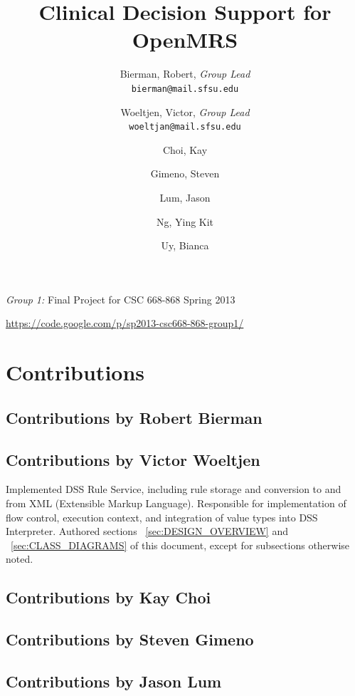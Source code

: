 \documentclass[12pt,letterpaper]{article}
\title{
  Clinical Decision Support for OpenMRS
}
\author{
        Bierman, Robert,  \emph{Group Lead}  \\ \texttt{bierman@mail.sfsu.edu} \and 
        Woeltjen, Victor, \emph{Group Lead}  \\ \texttt{woeltjan@mail.sfsu.edu} \and
        Choi, Kay       \and
        Gimeno, Steven  \and
        Lum, Jason      \and
        Ng, Ying Kit    \and
        Uy, Bianca      
}
\begin{document}
\newpage 

\maketitle
\begin{center}
\begin{Large}\emph{Group 1:} Final Project for CSC 668-868 Spring 2013\end{Large} \linebreak
\url{https://code.google.com/p/sp2013-csc668-868-group1/}
\end{center}
\thispagestyle{empty} %

\newpage {}
\tableofcontents


\newpage {}
\section{Contributions} 

\subsection{Contributions by Robert Bierman}

\subsection{Contributions by Victor Woeltjen}

Implemented DSS Rule Service, including rule storage and conversion to and from XML (Extensible Markup Language). Responsible for implementation of flow control, execution 
context, and integration of value types into DSS Interpreter. Authored sections 
~\ref{sec:DESIGN_OVERVIEW} and
~\ref{sec:CLASS_DIAGRAMS} of this document, except for subsections otherwise noted.

\subsection{Contributions by Kay Choi}

\subsection{Contributions by Steven Gimeno}

\subsection{Contributions by Jason Lum}
\end{document}
